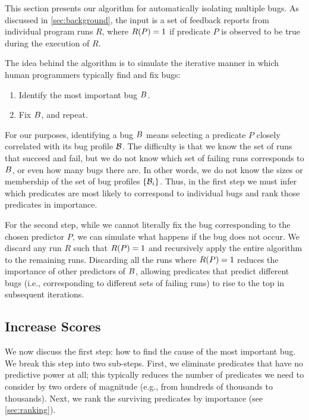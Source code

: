 This section presents our algorithm for automatically isolating
multiple bugs.  As discussed in \autoref{sec:background}, the input is
a set of feedback reports from individual program runs $R$, where
$R(P) = 1$ if predicate $P$ is observed to be true during the
execution of $R$.

The idea behind the algorithm is to simulate the iterative manner in which human programmers
typically find and fix bugs:
\begin{enumerate}

\item Identify the most important bug $B$.

\item Fix $B$, and repeat.

\end{enumerate}

For our purposes, identifying a bug $B$ means selecting a
predicate $P$ closely correlated with its bug profile $\mathcal{B}$.  The difficulty is that we
know the set of runs that succeed and fail, but we do not know which
set of failing runs corresponds to $B$, or even how many bugs there
are.  In other words, we do not know the sizes or membership of the set
of bug profiles $\{\mathcal{B}_i\}$.
Thus, in the first step we must infer which predicates are most
likely to correspond to individual bugs and rank those predicates in
importance.

For the second step, while we cannot literally fix the bug
corresponding to the chosen predictor $P$, we can simulate what
happens if the bug does not occur.  We discard any run $R$ such that
$R(P) = 1$ and recursively apply the entire algorithm to the remaining runs.  Discarding all the runs where
$R(P) = 1$ reduces the importance of other predictors of
$B$, allowing predicates that predict different bugs (i.e.,
corresponding to different sets of failing runs) to rise to the top in
subsequent iterations.

\subsection{Increase Scores}
\label{sec:increase}

We now discuss the first step: how to find the cause of the most important bug.
We break this step into two sub-steps.  First, we eliminate predicates that have no
predictive power at all; this typically reduces the number of predicates we need
to consider by two orders of magnitude (e.g., from hundreds of thousands to thousands).
Next, we rank the surviving predicates by importance (see \autoref{sec:ranking}).

